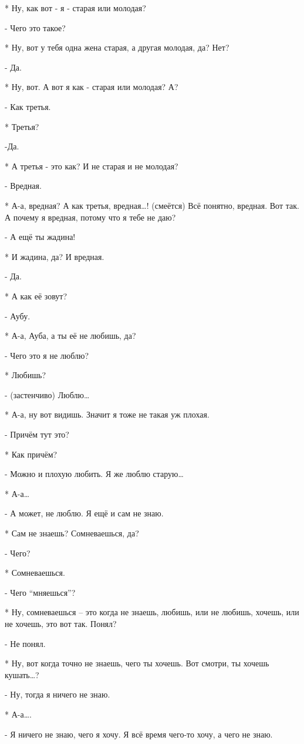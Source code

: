 * Ну, как вот - я - старая или молодая?

- Чего это такое?

* Ну, вот у тебя одна жена старая, а другая молодая, да? Нет?

- Да.

* Ну, вот. А вот я как - старая или молодая? А?

-  Как третья.

* Третья? 

-Да.

* А третья - это как? И не старая и не молодая?

- Вредная.

* А-а, вредная? А как третья, вредная…! (смеётся) Всё понятно, вредная. Вот так. А почему я вредная, потому что я тебе не даю?

- А ещё ты жадина!

* И жадина, да? И вредная.

- Да.

* А как её зовут?

- Аубу.

* А-а, Ауба, а ты её не любишь, да?

- Чего это я не люблю?

* Любишь?

- (застенчиво) Люблю…

* А-а, ну вот видишь. Значит я тоже не такая уж плохая.

- Причём тут это?

* Как причём?

- Можно и плохую любить. Я же люблю старую…

 * А-а…

- А может, не люблю. Я ещё и сам не знаю.

* Сам не знаешь? Сомневаешься, да?

- Чего?

* Сомневаешься.

- Чего “мняешься”?

* Ну, сомневаешься – это когда не знаешь, любишь, или не любишь, хочешь, или не хочешь, это вот так. Понял?

- Не понял.

* Ну, вот когда точно не знаешь, чего ты хочешь. Вот смотри, ты хочешь кушать…?

- Ну, тогда я ничего не знаю.

* А-а….

- Я ничего не знаю, чего я хочу. Я всё время чего-то хочу, а чего не знаю.

